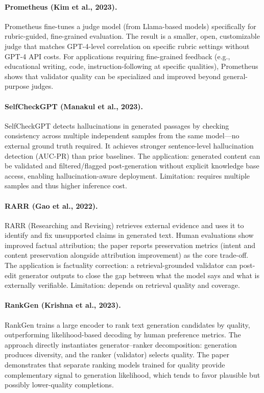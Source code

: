 \documentclass[11pt]{article}
\begin{document}
\paragraph{Prometheus (Kim et al., 2023).}
Prometheus fine-tunes a judge model (from Llama-based models) specifically for rubric-guided, fine-grained evaluation. The result is a smaller, open, customizable judge that matches GPT-4-level correlation on specific rubric settings without GPT-4 API costs. For applications requiring fine-grained feedback (e.g., educational writing, code, instruction-following at specific qualities), Prometheus shows that validator quality can be specialized and improved beyond general-purpose judges.

\paragraph{SelfCheckGPT (Manakul et al., 2023).}
SelfCheckGPT detects hallucinations in generated passages by checking consistency across multiple independent samples from the same model---no external ground truth required. It achieves stronger sentence-level hallucination detection (AUC-PR) than prior baselines. The application: generated content can be validated and filtered/flagged post-generation without explicit knowledge base access, enabling hallucination-aware deployment. Limitation: requires multiple samples and thus higher inference cost.

\paragraph{RARR (Gao et al., 2022).}
RARR (Researching and Revising) retrieves external evidence and uses it to identify and fix unsupported claims in generated text. Human evaluations show improved factual attribution; the paper reports preservation metrics (intent and content preservation alongside attribution improvement) as the core trade-off. The application is factuality correction: a retrieval-grounded validator can post-edit generator outputs to close the gap between what the model says and what is externally verifiable. Limitation: depends on retrieval quality and coverage.

\paragraph{RankGen (Krishna et al., 2023).}
RankGen trains a large encoder to rank text generation candidates by quality, outperforming likelihood-based decoding by human preference metrics. The approach directly instantiates generator--ranker decomposition: generation produces diversity, and the ranker (validator) selects quality. The paper demonstrates that separate ranking models trained for quality provide complementary signal to generation likelihood, which tends to favor plausible but possibly lower-quality completions.
\end{document}
